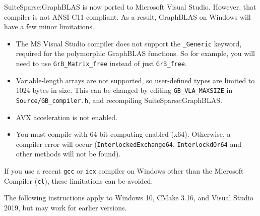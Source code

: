 \documentclass[12pt]{article}
\begin{document}
SuiteSparse:GraphBLAS is now ported to Microsoft Visual Studio.  However, that
compiler is not ANSI C11 compliant. As a result, GraphBLAS on Windows will have
a few minor limitations.

\begin{itemize}
\item The MS Visual Studio compiler does not support the \verb'_Generic'
keyword, required for the polymorphic GraphBLAS functions.  So for example, you
will need to use \verb'GrB_Matrix_free' instead of just \verb'GrB_free'.

\item Variable-length arrays are not supported, so user-defined
types are limited to 1024 bytes in size.  This can be changed by editing
\verb'GB_VLA_MAXSIZE' in \verb'Source/GB_compiler.h', and recompiling
SuiteSparse:GraphBLAS.

\item AVX acceleration is not enabled.

\item You must compile with 64-bit computing enabled (x64).  Otherwise, a
compiler error will occur (\verb'InterlockedExchange64', \verb'InterlockdOr64'
and other methods will not be found).

\end{itemize}

If you use a recent \verb'gcc' or \verb'icx' compiler on Windows other than the
Microsoft Compiler (\verb'cl'), these limitations can be avoided.

The following instructions apply to Windows 10, CMake 3.16, and
Visual Studio 2019, but may work for earlier versions.
\end{document}
